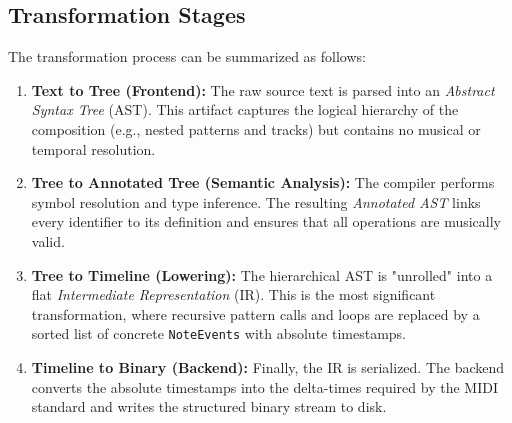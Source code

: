 \subsection{Transformation Stages}

The transformation process can be summarized as follows:

\begin{enumerate}
  \item \textbf{Text to Tree (Frontend):} The raw source text is parsed into an \textit{Abstract Syntax Tree}
    (AST). This artifact captures the logical hierarchy of the composition (e.g., nested patterns and tracks)
    but contains no musical or temporal resolution.
  \item \textbf{Tree to Annotated Tree (Semantic Analysis):} The compiler performs symbol resolution and type
    inference. The resulting \textit{Annotated AST} links every identifier to its definition and ensures that
    all operations are musically valid.
  \item \textbf{Tree to Timeline (Lowering):} The hierarchical AST is "unrolled" into a flat
    \textit{Intermediate Representation} (IR). This is the most significant transformation, where recursive
    pattern calls and loops are replaced by a sorted list of concrete \texttt{NoteEvents} with absolute timestamps.
  \item \textbf{Timeline to Binary (Backend):} Finally, the IR is serialized. The backend converts the
    absolute timestamps into the delta-times required by the MIDI standard and writes the structured binary
    stream to disk.
\end{enumerate}
